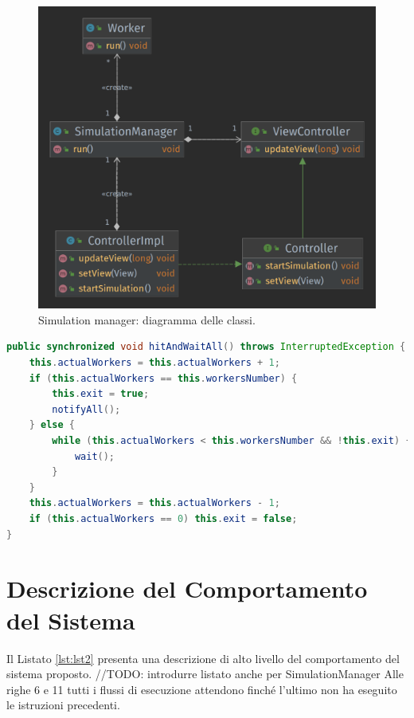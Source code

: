 \documentclass[12pt,a4paper,openright,twoside]{book}
\begin{document}
\begin{figure}
	\centering
	\includegraphics[width=\linewidth]{figures/simulation-manager.png}
	\caption{Simulation manager: diagramma delle classi.}
	\label{fig:SimulatioManager}
\end{figure}

\begin{lstlisting}[float,
					language=Java,
					label=lst:lst3,caption=Implementazione della barrier]
public synchronized void hitAndWaitAll() throws InterruptedException {
	this.actualWorkers = this.actualWorkers + 1;
	if (this.actualWorkers == this.workersNumber) {
		this.exit = true;
		notifyAll();
	} else {
		while (this.actualWorkers < this.workersNumber && !this.exit) {
			wait();
		}
	}
	this.actualWorkers = this.actualWorkers - 1;
	if (this.actualWorkers == 0) this.exit = false;
}
\end{lstlisting}

\chapter{Descrizione del Comportamento del Sistema} %
\label{chap:Descrizione del Comportamento del Sistema}

Il Listato \ref{lst:lst2} presenta una descrizione di alto livello del
comportamento del sistema proposto.
//TODO: introdurre listato anche per SimulationManager
Alle righe 6 e 11 tutti i flussi di esecuzione attendono finché l'ultimo non ha eseguito le istruzioni precedenti.
\end{document}
